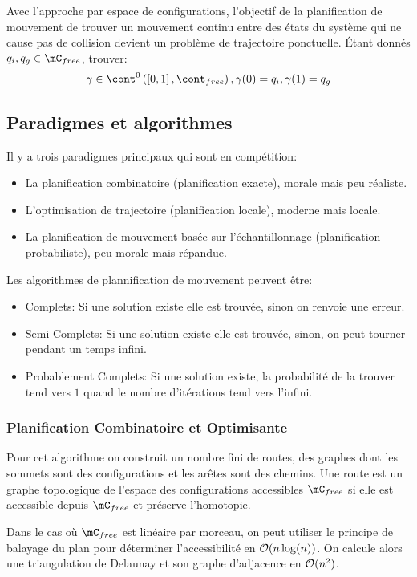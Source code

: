 \documentclass[math]{cours}
\begin{document}
Avec l'approche par espace de configurations, l'objectif de la planification de mouvement de trouver un mouvement continu entre des états du système qui ne cause pas de collision devient un problème de trajectoire ponctuelle.
Étant donnés $q_{i}, q_{g} \in \mC_{free}$, trouver:
\begin{equation*}
	\gamma \in \cont^{0}\left(\left[0, 1\right], \cont_{free}\right), \gamma(0) = q_{i}, \gamma(1) = q_{g}
\end{equation*}

\subsection{Paradigmes et algorithmes}
Il y a trois paradigmes principaux qui sont en compétition:
\begin{itemize}
	\item La planification combinatoire (planification exacte), morale mais peu réaliste.
	\item L'optimisation de trajectoire (planification locale), moderne mais locale.
	\item La planification de mouvement basée sur l'échantillonnage (planification probabiliste), peu morale mais répandue.
\end{itemize}

Les algorithmes de plannification de mouvement peuvent être:
\begin{itemize}
	\item Complets: Si une solution existe elle est trouvée, sinon on renvoie une erreur.
	\item Semi-Complets: Si une solution existe elle est trouvée, sinon, on peut tourner pendant un temps infini.
	\item Probablement Complets: Si une solution existe, la probabilité de la trouver tend vers $1$ quand le nombre d'itérations tend vers l'infini.
\end{itemize}

\subsubsection{Planification Combinatoire et Optimisante}
Pour cet algorithme on construit un nombre fini de routes, des graphes dont les sommets sont des configurations et les arêtes sont des chemins.
Une route est un graphe topologique de l'espace des configurations accessibles $\mC_{free}$ si elle est accessible depuis $\mC_{free}$ et préserve l'homotopie.

Dans le cas où $\mC_{free}$ est linéaire par morceau, on peut utiliser le principe de balayage du plan pour déterminer l'accessibilité en $\mathcal{O}(n\log(n))$.
On calcule alors une triangulation de Delaunay et son graphe d'adjacence en $\mathcal{O}(n^{2})$.
\end{document}
